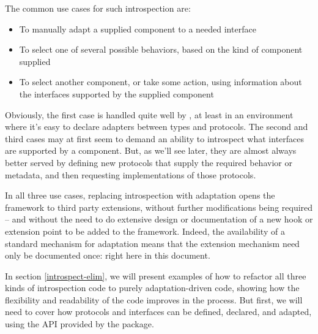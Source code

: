 The common use cases for such introspection are:

\begin{itemize}

\item To manually adapt a supplied component to a needed interface

\item To select one of several possible behaviors, based on the kind of
component supplied

\item To select another component, or take some action, using information
about the interfaces supported by the supplied component

\end{itemize}

Obviously, the first case is handled quite well by , at
least in an environment where it's easy to declare adapters between types and
protocols.  The second and third cases may at first seem to demand an ability
to introspect what interfaces are supported by a component.  But, as we'll
see later, they are almost always better served by defining new protocols
that supply the required behavior or metadata, and then requesting
implementations of those protocols.

In all three use cases, replacing introspection with adaptation opens the
framework to third party extensions, without further modifications being
required -- and without the need to do extensive design or documentation
of a new hook or extension point to be added to the framework.  Indeed,
the availability of a standard mechanism for adaptation means that the
extension mechanism need only be documented once: right here in this
document.


In section \ref{introspect-elim}, we will present examples of how to
refactor all three kinds of introspection code to purely adaptation-driven
code, showing how the flexibility and readability of the code improves in the
process.  But first, we will need to cover how protocols and interfaces can
be defined, declared, and adapted, using the API provided by the
 package.



































